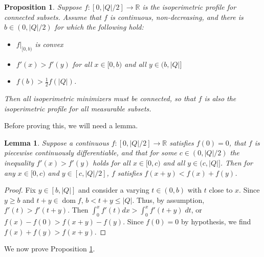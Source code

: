 \documentclass[leqno]{article}
\numberwithin{equation}{section}
\theoremstyle{definition}
\theoremstyle{remark}
\theoremstyle{plain}
\newtheorem{lemma}[equation]{Lemma}
\newtheorem{proposition}[equation]{Proposition}
\begin{document}
\begin{proposition}\label{prop:connecttodisconnect} Suppose $f:[0,|Q|/2]\rightarrow \mathbb{R}$ is the isoperimetric profile for connected subsets.  Assume that $f$ is continuous, non-decreasing, and there is $b\in (0,|Q|/2)$ for which the following hold:

\begin{itemize}\item $f|_{[0,b)}$ is convex

\item  $f'(x) > f'(y) $ for all $x\in [0,b)$ and all $y\in (b,|Q|]$

\item  $f(b) > \frac{1}{2} f(|Q|)$.

\end{itemize}

Then all isoperimetric minimizers must be connected, so that $f$ is also the isoperimetric profile for all measurable subsets.

\end{proposition}

Before proving this, we will need a lemma.

\begin{lemma}\label{lem:connect} Suppose a continuous $f:[0,|Q|/2]\rightarrow \mathbb{R}$ satisfies $f(0) = 0$, that $f$ is piecewise continuously differentiable, and that for some $c\in (0,|Q|/2)$ the inequality $f'(x) > f'(y)$ holds for all $x\in [0,c)$ and all $y\in (c,|Q|]$.  Then for any $x\in [0,c)$ and $y\in [c,|Q|/2]$, $f$ satisfies $f(x+y) < f(x) + f(y)$.

\end{lemma}

\begin{proof}  Fix $y\in [b,|Q|]$ and consider a varying $t\in (0,b)$ with $t$ close to $x$.  Since $y \geq b$ and $t+y \in \operatorname{dom} f$, $b < t+y \leq |Q|$.  Thus, by assumption, $f'(t) > f'(t+y)$.  Then $\int_{0}^x f'(t) dx > \int_0^x f'(t+y)\; dt$, or $f(x) - f(0) > f(x+y) - f(y)$.  Since $f(0) = 0$ by hypothesis, we find $f(x) + f(y) > f(x+y)$.
\end{proof}

We now prove Proposition \ref{prop:connecttodisconnect}.
\end{document}
